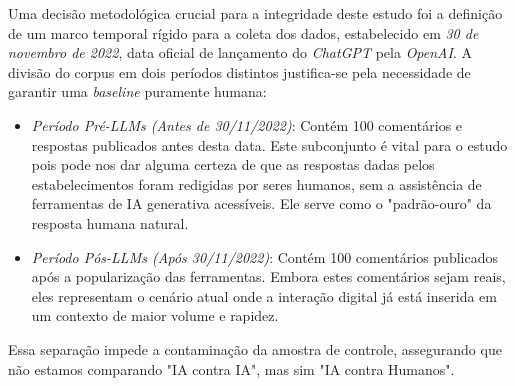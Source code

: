 \documentclass[12pt, a4paper]{article}
\numberwithin{equation}{section}
\begin{document}
Uma decisão metodológica crucial para a integridade deste estudo foi a definição de um marco temporal rígido para a coleta dos dados, estabelecido em \textit{30 de novembro de 2022}, data oficial de lançamento do \textit{ChatGPT} pela \textit{OpenAI}. A divisão do corpus em dois períodos distintos justifica-se pela necessidade de garantir uma \textit{baseline} puramente humana:

\begin{itemize}
    \item \textit{{Período Pré-LLMs (Antes de 30/11/2022)}}: Contém 100 comentários e respostas publicados antes desta data. Este subconjunto é vital para o estudo pois pode nos dar alguma certeza de que as respostas dadas pelos estabelecimentos foram redigidas por seres humanos, sem a assistência de ferramentas de IA generativa acessíveis. Ele serve como o "padrão-ouro" da resposta humana natural.

    \item \textit{{Período Pós-LLMs (Após 30/11/2022)}}: Contém 100 comentários publicados após a popularização das ferramentas. Embora estes comentários sejam reais, eles representam o cenário atual onde a interação digital já está inserida em um contexto de maior volume e rapidez.
\end{itemize}

Essa separação impede a contaminação da amostra de controle, assegurando que não estamos comparando "IA contra IA", mas sim "IA contra Humanos".
\end{document}
